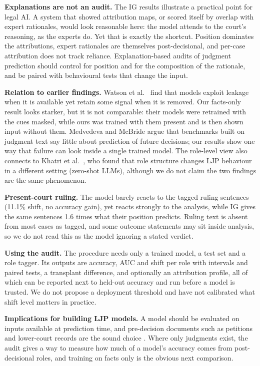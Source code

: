 \documentclass[conference]{IEEEtran}
\begin{document}
\textbf{Explanations are not an audit.} The IG results illustrate a practical point for legal AI. A system that showed attribution maps, or scored itself by overlap with expert rationales, would look reasonable here: the model attends to the court's reasoning, as the experts do. Yet that is exactly the shortcut. Position dominates the attributions, expert rationales are themselves post-decisional, and per-case attribution does not track reliance. Explanation-based audits of judgment prediction should control for position and for the composition of the rationale, and be paired with behavioural tests that change the input.

\textbf{Relation to earlier findings.} Watson et al.\ \cite{watson2026shortcut} find that models exploit leakage when it is available yet retain some signal when it is removed. Our facts-only result looks starker, but it is not comparable: their models were retrained with the cues masked, while ours was trained with them present and is then shown input without them. Medvedeva and McBride \cite{medvedeva2023mcbride} argue that benchmarks built on judgment text say little about prediction of future decisions; our results show one way that failure can look inside a single trained model. The role-level view also connects to Khatri et al.\ \cite{khatri2025structured}, who found that role structure changes LJP behaviour in a different setting (zero-shot LLMs), although we do not claim the two findings are the same phenomenon.

\textbf{Present-court ruling.} The model barely reacts to the tagged ruling sentences (11.1\% shift, no accuracy gain), yet reacts strongly to the analysis, while IG gives the same sentences 1.6 times what their position predicts. Ruling text is absent from most cases as tagged, and some outcome statements may sit inside analysis, so we do not read this as the model ignoring a stated verdict.

\textbf{Using the audit.} The procedure needs only a trained model, a test set and a role tagger. Its outputs are accuracy, AUC and shift per role with intervals and paired tests, a transplant difference, and optionally an attribution profile, all of which can be reported next to held-out accuracy and run before a model is trusted. We do not propose a deployment threshold and have not calibrated what shift level matters in practice.

\textbf{Implications for building LJP models.} A model should be evaluated on inputs available at prediction time, and pre-decision documents such as petitions and lower-court records are the sound choice \cite{medvedeva2023mcbride}. Where only judgments exist, the audit gives a way to measure how much of a model's accuracy comes from post-decisional roles, and training on facts only is the obvious next comparison.
\end{document}
